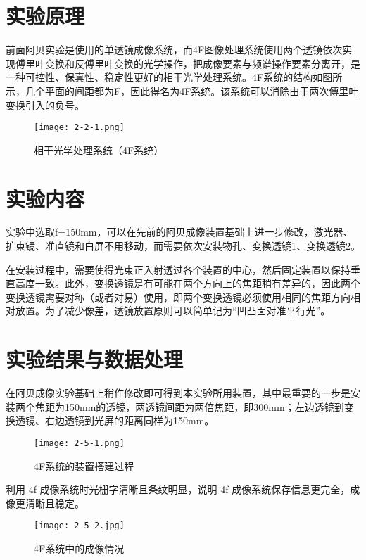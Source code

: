 \documentclass[12pt]{article}
\begin{document}
\section{实验原理}
前面阿贝实验是使用的单透镜成像系统，而4F图像处理系统使用两个透镜依次实现傅里叶变换和反傅里叶变换的光学操作，把成像要素与频谱操作要素分离开，是一种可控性、保真性、稳定性更好的相干光学处理系统。4F系统的结构如图所示，几个平面的间距都为F，因此得名为4F系统。该系统可以消除由于两次傅里叶变换引入的负号。

\begin{figure}[htbp]
    \centering
    \texttt{[image: 2-2-1.png]}
    \caption{相干光学处理系统（4F系统）}
\end{figure}

\section{实验内容}
实验中选取f=150mm，可以在先前的阿贝成像装置基础上进一步修改，激光器、扩束镜、准直镜和白屏不用移动，而需要依次安装物孔、变换透镜1、变换透镜2。

在安装过程中，需要使得光束正入射透过各个装置的中心，然后固定装置以保持垂直高度一致。此外，变换透镜是有可能在两个方向上的焦距稍有差异的，因此两个变换透镜需要对称（或者对易）使用，即两个变换透镜必须使用相同的焦距方向相对放置。为了减少像差，透镜放置原则可以简单记为“凹凸面对准平行光”。

\section{实验结果与数据处理}
在阿贝成像实验基础上稍作修改即可得到本实验所用装置，其中最重要的一步是安装两个焦距为150mm的透镜，两透镜间距为两倍焦距，即300mm；左边透镜到变换透镜、右边透镜到光屏的距离同样为150mm。

\begin{figure}[htbp]
    \centering
    \texttt{[image: 2-5-1.png]}
    \caption{4F系统的装置搭建过程}
\end{figure}

利用 4f 成像系统时光栅字清晰且条纹明显，说明 4f 成像系统保存信息更完全，成像更清晰且稳定。

\begin{figure}[htbp]
    \centering
    \texttt{[image: 2-5-2.jpg]}
    \caption{4F系统中的成像情况}
\end{figure}

\end{document}

